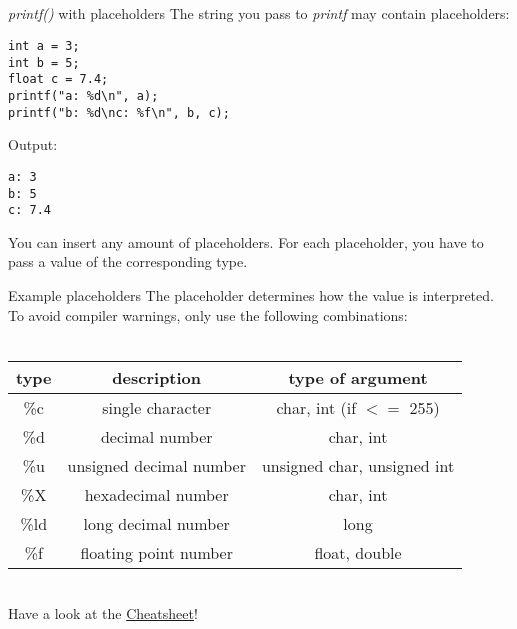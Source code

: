 \subsection{}
\begin{frame}[fragile]{\textit{printf()} with placeholders}
	The string you pass to \textit{printf} may contain placeholders:
	\begin{lstlisting}[numbers=none]
int a = 3;
int b = 5;
float c = 7.4;
printf("a: %d\n", a);
printf("b: %d\nc: %f\n", b, c);
\end{lstlisting}
Output:\begin{lstlisting}[numbers=none]
a: 3
b: 5
c: 7.4
\end{lstlisting}
You can insert any amount of placeholders. For each placeholder, you have to pass a value of the corresponding type.
\end{frame}

\begin{frame}{Example placeholders}
	The placeholder determines how the value is interpreted.
	To avoid compiler warnings, only use the following combinations: \\ \ \\
	\begin{tabular}{|c|c|c|}
		\hline
		\textbf{type} & \textbf{description} & \textbf{type of argument} \\\hline
		\%c & single character & char, int (if $<=$ 255) \\\hline
		\%d & decimal number & char, int \\\hline
		\%u & unsigned decimal number & unsigned char, unsigned int \\\hline
		\%X & hexadecimal number & char, int \\\hline
		\%ld & long decimal number & long \\\hline
		\%f & floating point number & float, double \\\hline
	\end{tabular}
	\\
	Have a look at the \href{https://github.com/scholzp/c-lessons/blob/master/cheatsheet/cheatsheet.pdf}{Cheatsheet}!
\end{frame}

